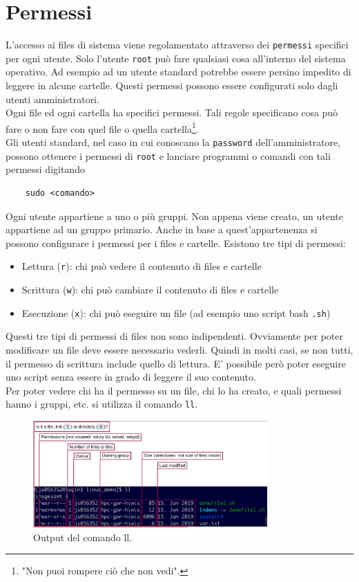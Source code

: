 \section{Permessi}
L'accesso ai files di sistema viene regolamentato attraverso dei \verb"permessi" specifici per ogni utente. Solo l'utente \verb"root" può fare qualsiasi cosa all'interno del sistema operativo. Ad esempio ad un utente standard potrebbe essere persino impedito di leggere in alcune cartelle. Questi permessi possono essere configurati solo dagli utenti amministratori. \\
Ogni file ed ogni cartella ha specifici permessi. Tali regole specificano cosa può fare o non fare con quel file o quella cartella\footnote{"Non puoi rompere ciò che non vedi".}.\\
Gli utenti standard, nel caso in cui conoscano la \verb"password" dell'amministratore, possono ottenere i permessi di \verb"root" e lanciare programmi o comandi con tali permessi digitando
\begin{verbatim}
	sudo <comando>
\end{verbatim}

Ogni utente appartiene a uno o più gruppi. Non appena viene creato, un utente appartiene ad un gruppo primario. Anche in base a quest'appartenenza si possono configurare i permessi per i files e cartelle. Esistono tre tipi di permessi:
\begin{itemize}
	\item Lettura (\verb"r"): chi può vedere il contenuto di files e cartelle
	\item Scrittura (\verb"w"): chi può cambiare il contenuto di files e cartelle
	\item Esecuzione (\verb"x"): chi può eseguire un file (ad esempio uno script bash \verb".sh")
\end{itemize}

Questi tre tipi di permessi di files non sono indipendenti. Ovviamente per poter modificare un file deve essere necessario vederli. Quindi in molti casi, se non tutti, il permesso di scrittura include quello di lettura. E' possibile però poter eseguire uno script senza essere in grado di leggere il suo contenuto. \\
Per poter vedere chi ha il permesso su un file, chi lo ha creato, e quali permessi hanno i gruppi, etc. si utilizza il comando \verb"ll".

\begin{figure}
	\centering
	\includegraphics[width=0.8\textwidth]{img/permessi.png}
	\caption{Output del comando ll.}
	\label{llcommand}
\end{figure}

